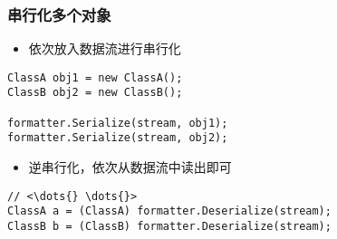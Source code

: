 \begin{frame}[fragile]
\frametitle{串行化多个对象}
\begin{itemize}
\item 依次放入数据流进行串行化
\end{itemize}
\begin{lstlisting}
ClassA obj1 = new ClassA();
ClassB obj2 = new ClassB();

formatter.Serialize(stream, obj1);
formatter.Serialize(stream, obj2);

\end{lstlisting}
\begin{itemize}
\item 逆串行化，依次从数据流中读出即可
\end{itemize}
\begin{lstlisting}[escapeinside=<>]
// <\dots{} \dots{}>
ClassA a = (ClassA) formatter.Deserialize(stream);
ClassB b = (ClassB) formatter.Deserialize(stream);
\end{lstlisting}
\end{frame}


